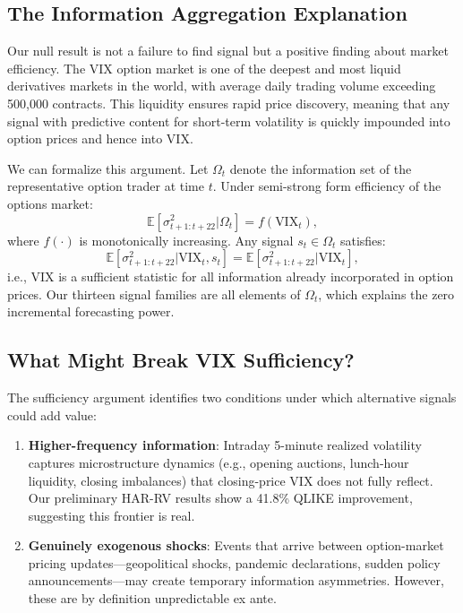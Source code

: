 \documentclass[12pt,a4paper]{article}
\begin{document}
\subsection{The Information Aggregation Explanation}

Our null result is not a failure to find signal but a positive finding about market efficiency. The VIX option market is one of the deepest and most liquid derivatives markets in the world, with average daily trading volume exceeding 500,000 contracts. This liquidity ensures rapid price discovery, meaning that any signal with predictive content for short-term volatility is quickly impounded into option prices and hence into VIX.

We can formalize this argument. Let $\Omega_t$ denote the information set of the representative option trader at time $t$. Under semi-strong form efficiency of the options market:
\begin{equation}
\mathbb{E}[\sigma^2_{t+1:t+22} | \Omega_t] = f(\text{VIX}_t),
\label{eq:efficiency}
\end{equation}
where $f(\cdot)$ is monotonically increasing. Any signal $s_t \in \Omega_t$ satisfies:
\begin{equation}
\mathbb{E}[\sigma^2_{t+1:t+22} | \text{VIX}_t, s_t] = \mathbb{E}[\sigma^2_{t+1:t+22} | \text{VIX}_t],
\label{eq:sufficiency}
\end{equation}
i.e., VIX is a sufficient statistic for all information already incorporated in option prices. Our thirteen signal families are all elements of $\Omega_t$, which explains the zero incremental forecasting power.

\subsection{What Might Break VIX Sufficiency?}
\label{subsec:break_vix}

The sufficiency argument identifies two conditions under which alternative signals could add value:

\begin{enumerate}
    \item \textbf{Higher-frequency information}: Intraday 5-minute realized volatility captures microstructure dynamics (e.g., opening auctions, lunch-hour liquidity, closing imbalances) that closing-price VIX does not fully reflect. Our preliminary HAR-RV results show a 41.8\% QLIKE improvement, suggesting this frontier is real.

    \item \textbf{Genuinely exogenous shocks}: Events that arrive between option-market pricing updates---geopolitical shocks, pandemic declarations, sudden policy announcements---may create temporary information asymmetries. However, these are by definition unpredictable ex ante.
\end{enumerate}
\end{document}
